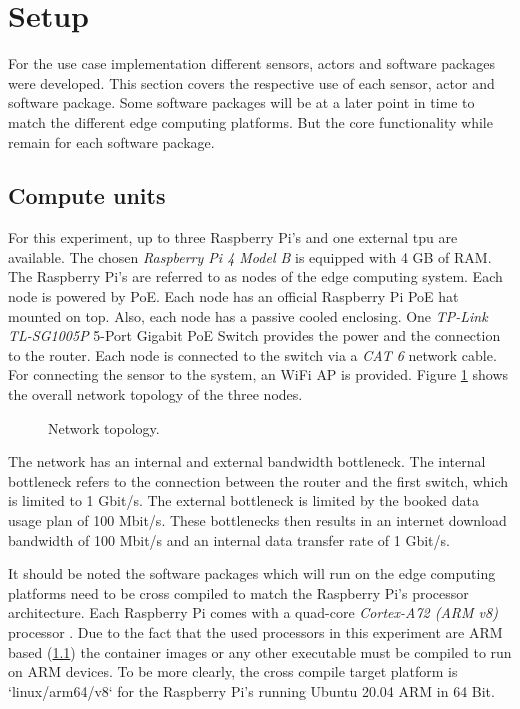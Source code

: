 \section{Setup}
For the use case implementation different sensors, actors and software packages were developed. This section covers the respective use of each sensor, actor and software package. Some software packages will be at a later point in time to match the different edge computing platforms. But the core functionality while remain for each software package.

\subsection{Compute units}\label{subsec:compute-units}
For this experiment, up to three Raspberry Pi's and one external \gls{tpu} are available. The chosen \textit{Raspberry Pi 4 Model B} is equipped with 4 GB of \gls{RAM}. The Raspberry Pi's are referred to as nodes of the edge computing system. Each node is powered by \gls{PoE}. Each node has an official Raspberry Pi \gls{PoE} hat mounted on top. Also, each node has a passive cooled enclosing. One \textit{TP-Link TL-SG1005P} 5-Port Gigabit PoE Switch provides the power and the connection to the router. Each node is connected to the switch via a \textit{CAT 6} network cable. For connecting the sensor to the system, an WiFi \gls{AP} is provided. Figure \ref{fig:network-topology} shows the overall network topology of the three nodes.

\begin{figure}[H]
    \fontsize{9}{10}\selectfont %
    \centering
    \def\svgwidth{\textwidth}
    
    \caption{Network topology.}
    \label{fig:network-topology}
\end{figure}

The network has an internal and external bandwidth bottleneck. The internal bottleneck refers to the connection between the router and the first switch, which is limited to 1 Gbit/s. The external bottleneck is limited by the booked data usage plan of 100 Mbit/s. These bottlenecks then results in an internet download bandwidth of 100 Mbit/s and an internal data transfer rate of 1 Gbit/s.

\bigskip
It should be noted the software packages which will run on the edge computing platforms need to be cross compiled to match the Raspberry Pi's processor architecture. Each Raspberry Pi comes with a quad-core \textit{Cortex-A72 (ARM v8)} processor \cite{Raspberrypifoundation}. Due to the fact that the used processors in this experiment are ARM based (\ref{subsec:compute-units}) the container images or any other executable must be compiled to run on ARM devices. To be more clearly, the cross compile target platform is `linux/arm64/v8` for the Raspberry Pi's running Ubuntu 20.04 ARM in 64 Bit.


